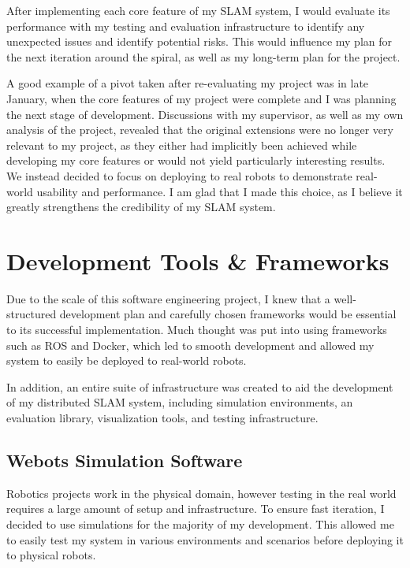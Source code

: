 After implementing each core feature of my SLAM system, I would evaluate its performance with my testing and evaluation infrastructure to identify any unexpected issues and identify potential risks. This would influence my plan for the next iteration around the spiral, as well as my long-term plan for the project.

A good example of a pivot taken after re-evaluating my project was in late January, when the core features of my project were complete and I was planning the next stage of development. Discussions with my supervisor, as well as my own analysis of the project, revealed that the original extensions were no longer very relevant to my project, as they either had implicitly been achieved while developing my core features or would not yield particularly interesting results. We instead decided to focus on deploying to real robots to demonstrate real-world usability and performance. I am glad that I made this choice, as I believe it greatly strengthens the credibility of my SLAM system.


\section{Development Tools \& Frameworks}
\label{sec:development-tools-and-frameworks}
Due to the scale of this software engineering project, I knew that a well-structured development plan and carefully chosen frameworks would be essential to its successful implementation. Much thought was put into using frameworks such as ROS and Docker, which led to smooth development and allowed my system to easily be deployed to real-world robots.

In addition, an entire suite of infrastructure was created to aid the development of my distributed SLAM system, including simulation environments, an evaluation library, visualization tools, and testing infrastructure.

\subsection{Webots Simulation Software}
\label{sec:webots-simulator}

Robotics projects work in the physical domain, however testing in the real world requires a large amount of setup and infrastructure. To ensure fast iteration, I decided to use simulations for the majority of my development. This allowed me to easily test my system in various environments and scenarios before deploying it to physical robots.

